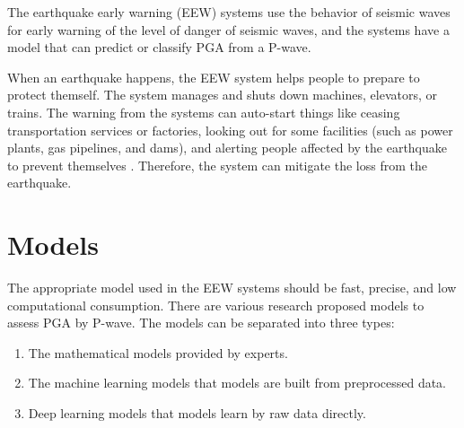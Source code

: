The earthquake early warning (EEW) systems use the behavior of seismic waves for early warning of the level of danger of seismic waves, and the systems have a model that can predict or classify PGA from a P-wave.

When an earthquake happens, the EEW system helps people to prepare to protect themself. The system manages and shuts down machines, elevators, or trains. The warning from the systems can auto-start things like ceasing transportation services or factories, looking out for some facilities (such as power plants, gas pipelines, and dams), and alerting people affected by the earthquake to prevent themselves \cite{gasparini2007earthquake, allen2019earthquake}. Therefore, the system can mitigate the loss from the earthquake.

 



\section{Models}
The appropriate model used in the EEW systems should be fast, precise, and low computational consumption. There are various research proposed models to assess PGA by P-wave. The models 
can be separated into three types:
\begin{enumerate}
    \item The mathematical models provided by experts.
    \item The machine learning models that models are built from preprocessed data.
    \item Deep learning models that models learn by raw data directly.
\end{enumerate}

